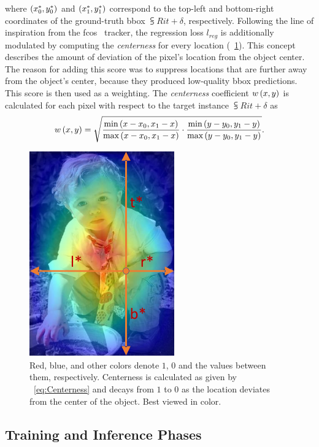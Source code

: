 where $\left( {{x}_{0}^{*}, {y}_{0}^{*}} \right)$ and $\left( {{x}_{1}^{*}, {y}_{1}^{*}} \right)$ correspond to the top-left and bottom-right coordinates of the ground-truth \gls{bbox} $\subsup{R}{i}{t + \delta}$, respectively. Following the line of inspiration from the \gls{fcos}~\cite{tian2019fcos} tracker, the regression loss $l_{reg}$ is additionally modulated by computing the \emph{centerness} for every location (\figtext{}~\ref{fig:FCOSCenterness}). This concept describes the amount of deviation of the pixel's location from the object center. The reason for adding this score was to suppress locations that are further away from the object's center, because they produced low-quality \gls{bbox} predictions. This score is then used as a weighting. The \emph{centerness} coefficient ${w} \left( x, y \right)$ is calculated for each pixel with respect to the target instance $\subsup{R}{i}{t + \delta}$ as
\begin{equation}
    \label{eq:Centerness}
    {w} \left( x, y \right) =
    \sqrt{
        \frac{\text{min} \left( x - x_0, x_1 - x \right)}{\text{max} \left( x - x_0, x_1 - x \right)}
        \cdot
        \frac{\text{min} \left( y - y_0, y_1 - y \right)}{\text{max} \left( y - y_0, y_1 - y \right)}
    }.
\end{equation}

\begin{figure}[t]
    \centerline{\includegraphics[width=0.2\linewidth]{figures/siamese_tracking/fcos_centerness.pdf}}
    \caption[Centerness visualization]{Red, blue, and other colors denote $1$, $0$ and the values between them, respectively. Centerness is calculated as given by \eqtext{}~\ref{eq:Centerness} and decays from $1$ to $0$ as the location deviates from the center of the object. Best viewed in color. }
    \label{fig:FCOSCenterness}
\end{figure}

\subsection{Training and Inference Phases}

